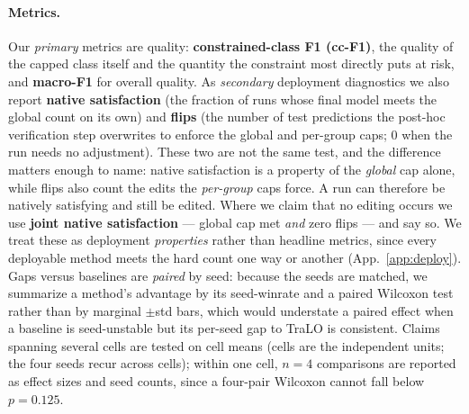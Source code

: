 \documentclass[10pt]{article}
\begin{document}
\paragraph{Metrics.}
Our \emph{primary} metrics are quality: \textbf{constrained-class F1
(cc-F1)}, the quality of the capped class itself and the quantity the
constraint most directly puts at risk, and \textbf{macro-F1} for overall
quality. As \emph{secondary} deployment diagnostics we also report
\textbf{native satisfaction} (the fraction of runs whose final model meets
the global count {on its own}) and
\textbf{flips} (the number of
test predictions the post-hoc verification step overwrites to enforce the
global and per-group caps; $0$ when the run needs no adjustment).
{These two are not the same test, and the difference matters enough
to name: native satisfaction is a property of the \emph{global} cap alone, while
flips also count the edits the \emph{per-group} caps force. A run can therefore
be natively satisfying and still be edited. Where we claim that no editing
occurs we use \textbf{joint native satisfaction} --- global cap met \emph{and}
zero flips --- and say so.} We treat
these as deployment \emph{properties} rather than headline metrics, since
every deployable method meets the hard count one way or another
(App.~\ref{app:deploy}). Gaps versus baselines are \emph{paired} by seed:
because the seeds are matched, we summarize a method's advantage by its
seed-winrate and a paired Wilcoxon test rather than by marginal $\pm$std
bars, which would understate a paired effect when a baseline is
seed-unstable but its per-seed gap to TraLO is consistent. Claims spanning
several cells are tested on cell means (cells are the independent units;
the four seeds recur across cells); within one cell, $n{=}4$ comparisons
are reported as effect sizes and seed counts, since a four-pair Wilcoxon
cannot fall below $p{=}0.125$.
\end{document}
